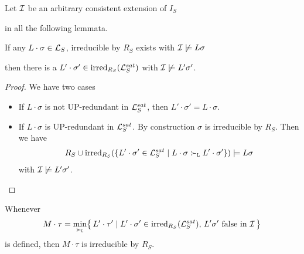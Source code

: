             Let \( \mathcal{I} \) be an arbitrary consistent extension of \( I_S \)

            in all the following lemmata.


       \begin{lemma}\label{existence}

        If any \( L\cdot\sigma\in\mathcal{L}_S \), irreducible by \( R_S \) exists with \( \mathcal{I}\not\models L\sigma \)

        then there is a \( L'\cdot\sigma'\in \operatorname{irred}_{R_S}(\mathcal{L}_S^{sat}) \) with \( \mathcal{I}\not\models L'\sigma' \).
       \end{lemma}

       \begin{proof}
            We have two cases

       \begin{itemize}
           \item If \( L\cdot\sigma \) is not UP-redundant in \( \mathcal{L}_S^{sat} \),
            then \( L'\cdot\sigma'=L\cdot\sigma \).
           \hfill\checkmark{}

           \item If \( L\cdot\sigma \) is UP-redundant in \( \mathcal{L}_S^{sat} \).
        By construction \( \sigma \) is irreducible by \( R_S \). Then we have
       \begin{align*}
            R_S \cup \operatorname{irred}_{R_S}(
               \{
                L'\cdot\sigma'\in\mathcal{L}_S^{sat}
               \mid
                L\cdot\sigma \mathrel\succ_{\mathtt{L}} L'\cdot\sigma'
               \}
            )
           \models
            L\sigma
       \end{align*}
        with \( \mathcal{I}\not\models L'\sigma' \).
       \hfill \checkmark{}
       \end{itemize}
   \end{proof}


       \begin{lemma}\label{irreducible}
            Whenever
           \begin{gather*}
                M\cdot\tau = \min_{\mathrel\succ_{\mathtt{L}}}\!
               \left \{ \,
                L'\cdot\tau' \mid
                L'\cdot\sigma' \in \operatorname{irred}_{R_S}(\mathcal{L}_S^{sat}), \,
                L'\sigma'\text{ false in }\mathcal{I} \,
               \right \}
           \end{gather*}
            is defined, then \( M\cdot\tau \) is irreducible by \( R_S \).
       \end{lemma}

